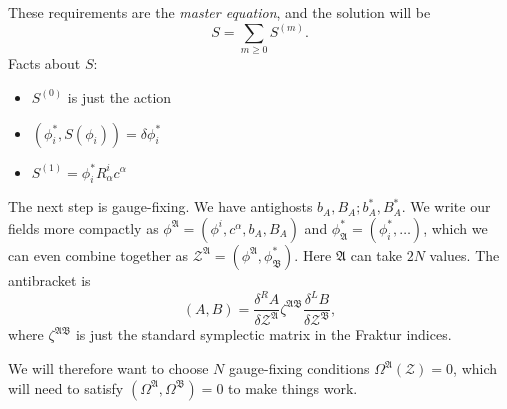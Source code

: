 These requirements are the \emph{master equation}, and the solution will be
\[
S = \sum_{m \ge 0} S^{(m)}.
\]
Facts about $S$:
\begin{itemize}
    \item $S^{(0)}$ is just the action
    \item $(\phi_i^*,S(\phi_i)) = \delta \phi_i^*$
    \item $S^{(1)} = \phi_i^* R_\alpha^i c^\alpha$
\end{itemize}

The next step is gauge-fixing.
We have antighosts $b_A, B_A; b_A^*, B_A^*$.
We write our fields more compactly as $\phi^{\mathfrak{A}} = (\phi^i, c^\alpha, b_A, B_A)$ and $\phi_{\mathfrak{A}}^* = (\phi_i^*, \dots)$, which we can even combine together as $\mathcal{Z}^{\mathfrak{A}} = (\phi^{\mathfrak{A}}, \phi_{\mathfrak{B}}^*)$.
Here $\mathfrak{A}$ can take $2N$ values.
The antibracket is
\[
(A,B) = \frac{\delta^R A}{\delta \mathcal{Z}^{\mathfrak{A}}} \zeta^{\mathfrak{AB}} \frac{\delta^L B}{\delta \mathcal{Z}^{\mathfrak{B}}},
\]
where $\zeta^{\mathfrak{AB}}$ is just the standard symplectic matrix in the Fraktur indices.

We will therefore want to choose $N$ gauge-fixing conditions $\Omega^{\mathfrak{A}}(\mathcal{Z}) = 0$, which will need to satisfy $(\Omega^\mathfrak{A}, \Omega^\mathfrak{B}) = 0$ to make things work.